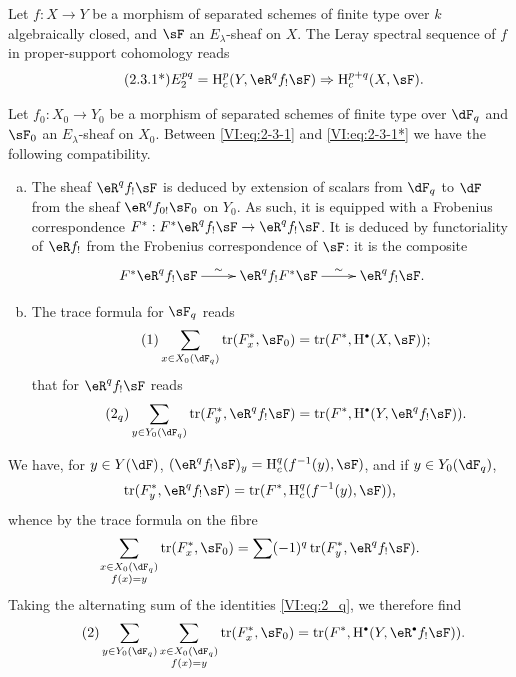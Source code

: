 Let $f:X\to Y$ be a morphism of separated schemes of finite type over $k$
algebraically closed, and $\sF$ an $E_\lambda$-sheaf on $X$. The
Leray spectral sequence of $f$ in proper-support cohomology reads 
\begin{align*}\tag{2.3.1*}\label{VI:eq:2-3-1*}
  E_2^{p q} = \h_c^p(Y,\eR^q f_! \sF) \Rightarrow \h_c^{p+q}(X,\sF) \text{.}
\end{align*}

Let $f_0:X_0 \to Y_0$ be a morphism of separated schemes of finite type over
$\dF_q$ and $\sF_0$ an $E_\lambda$-sheaf on $X_0$. Between
\eqref{VI:eq:2-3-1} and \eqref{VI:eq:2-3-1*} we have the following compatibility. 

\begin{enumerate}[a)]
  \item The sheaf $\eR^q f_! \sF$ is deduced by extension of scalars
    from $\dF_q$ to $\dF$ from the sheaf $\eR^q f_{0!} \sF_0$ on $Y_0$. As
    such, it is equipped with a Frobenius correspondence
    $F^\ast:F^\ast\eR^q f_! \sF \to \eR^q f_! \sF$. It is deduced by
    functoriality of $\eR f_!$ from the Frobenius correspondence of $\sF$:
    it is the composite 
    \[\xymatrix{
      F^\ast \eR^q f_! \sF \ar[r]^-\sim 
        & \eR^q f_! F^\ast \sF \ar[r]^-\sim 
        & \eR^q f_! \sF \text{.}
    }\]
  \item The trace formula for $\sF_q$ reads 
    \begin{align*}\tag{1}\label{VI:eq:1}
      \sum_{x\in X_0(\dF_q)} \tr(F_x^\ast,\sF_0) = \tr(F^\ast,\h^\bullet(X,\sF)) \text{;}
    \end{align*}
    that for $\eR^q f_! \sF$ reads 
    \begin{align*}\tag{2$_q$}\label{VI:eq:2_q} 
      \sum_{y\in Y_0(\dF_q)} \tr(F_y^\ast,\eR^q f_! \sF) = \tr(F^\ast, \h^\bullet(Y,\eR^q f_! \sF)) \text{.}
    \end{align*}
\end{enumerate}

We have, for $y\in Y(\dF)$, $(\eR^q f_! \sF)_y = \h_c^q(f^{-1}(y),\sF)$, and if
$y\in Y_0(\dF_q)$, 
\[
  \tr(F_y^\ast,\eR^q f_! \sF) = \tr(F^\ast,\h_c^q(f^{-1}(y),\sF)) \text{,}
\]
whence by the trace formula on the fibre 
\[
  \sum_{\substack{x\in X_0(\dF_q) \\ f(x) = y}} \tr(F_x^\ast,\sF_0) = \sum (-1)^q \tr(F_y^\ast,\eR^q f_! \sF) \text{.}
\]
Taking the alternating sum of the identities \eqref{VI:eq:2_q}, we therefore find 
\begin{align*}\tag{2}\label{VI:eq:2}
  \sum_{y\in Y_0(\dF_q)} \sum_{\substack{x \in X_0(\dF_q) \\ f(x) = y}} \tr(F_x^\ast,\sF_0) = \tr(F^\ast,\h^\bullet(Y,\eR^\bullet f_! \sF)) \text{.}
\end{align*}

